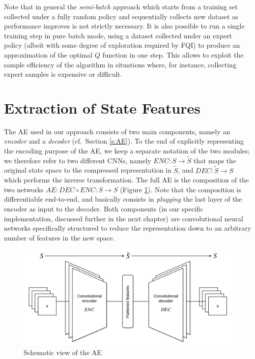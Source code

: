 %
Note that in general the \textit{semi-batch} approach which starts from a 
training set collected under a fully random policy and sequentially collects new
dataset as performance improves is not strictly necessary. It is also possible
to run a single training step in pure batch mode, using a dataset collected 
under an expert policy (albeit with some degree of exploration required by FQI) 
to produce an approximation of the optimal $Q$ function in one step. 
This allows to exploit the sample efficiency of the algorithm in situations 
where, for instance, collecting expert samples is expensive or difficult.

\section{Extraction of State Features}
The AE used in our approach consists of two main components, namely an 
\textit{encoder} and a \textit{decoder} (cf.\ Section \ref{s:AE}). To the end of 
explicitly representing the encoding purpose of the AE, we keep a separate 
notation of the two modules; we therefore refer to two different CNNs, namely 
$ENC: S \rightarrow \tilde{S}$ that maps the original state space to the 
compressed representation in $\tilde{S}$, and $DEC: \tilde{S} \rightarrow S$ 
which performs the inverse transformation. The full AE is the composition of the
two networks $AE: DEC \circ ENC: S \rightarrow S$ (Figure \ref{f:ae}). 
Note that the composition is differentiable end-to-end, and basically consists 
in \textit{plugging} the last layer of the encoder as input to the decoder. 
Both components (in our specific implementation, discussed further in the next
chapter) are convolutional neural networks specifically structured to reduce the
representation down to an arbitrary number of features in the new space.
%
\begin{figure}[h]
\includegraphics[width=\textwidth]{pictures/conv_autoencoder}
\centering
\caption{Schematic view of the AE}
\label{f:ae}
\end{figure}
%

